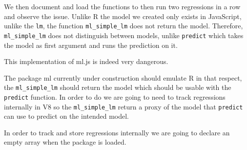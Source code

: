 \documentclass[
]{krantz}
\makeatletter
\newenvironment{Shaded}{\begin{snugshade}}{\end{snugshade}}
\newcommand{\CommentTok}[1]{\textcolor[rgb]{0.37,0.37,0.37}{\textit{#1}}}
\newcommand{\ControlFlowTok}[1]{\textcolor[rgb]{0.27,0.27,0.27}{\textbf{#1}}}
\newcommand{\DataTypeTok}[1]{\textcolor[rgb]{0.27,0.27,0.27}{#1}}
\newcommand{\DecValTok}[1]{\textcolor[rgb]{0.06,0.06,0.06}{#1}}
\newcommand{\KeywordTok}[1]{\textcolor[rgb]{0.27,0.27,0.27}{\textbf{#1}}}
\newcommand{\NormalTok}[1]{#1}
\newcommand{\OperatorTok}[1]{\textcolor[rgb]{0.43,0.43,0.43}{\textbf{#1}}}
\newcommand{\OtherTok}[1]{\textcolor[rgb]{0.37,0.37,0.37}{#1}}
\newcommand{\StringTok}[1]{\textcolor[rgb]{0.5,0.5,0.5}{#1}}
\newenvironment{kframe}{%
\medskip{}
\setlength{\fboxsep}{.8em}
 \def\at@end@of@kframe{}%
 \ifinner\ifhmode%
  \def\at@end@of@kframe{\end{minipage}}%
  \begin{minipage}{\columnwidth}%
 \fi\fi%
 \def\FrameCommand##1{\hskip\@totalleftmargin \hskip-\fboxsep
 \colorbox{shadecolor}{##1}\hskip-\fboxsep
     \hskip-\linewidth \hskip-\@totalleftmargin \hskip\columnwidth}%
 \MakeFramed {\advance\hsize-\width
   \@totalleftmargin\z@ \linewidth\hsize
   \@setminipage}}%
 {\par\unskip\endMakeFramed%
 \at@end@of@kframe}
\renewenvironment{Shaded}{\begin{kframe}}{\end{kframe}}
\makeatother
\begin{document}
We then document and load the functions to then run two regressions in a row and observe the issue. Unlike R the model we created only exists in JavaScript, unlike the \texttt{lm}, the function \texttt{ml\_simple\_lm} does not return the model. Therefore, \texttt{ml\_simple\_lm} does not distinguish between models, unlike \texttt{predict} which takes the model as first argument and runs the prediction on it.

This implementation of ml.js is indeed very dangerous.

\begin{Shaded}
\end{Shaded}

The package ml currently under construction should emulate R in that respect, the \texttt{ml\_simple\_lm} should return the model which should be usable with the \texttt{predict} function. In order to do we are going to need to track regressions internally in V8 so the \texttt{ml\_simple\_lm} return a proxy of the model that \texttt{predict} can use to predict on the intended model.

In order to track and store regressions internally we are going to declare an empty array when the package is loaded.

\begin{Shaded}
\end{Shaded}
\end{document}
